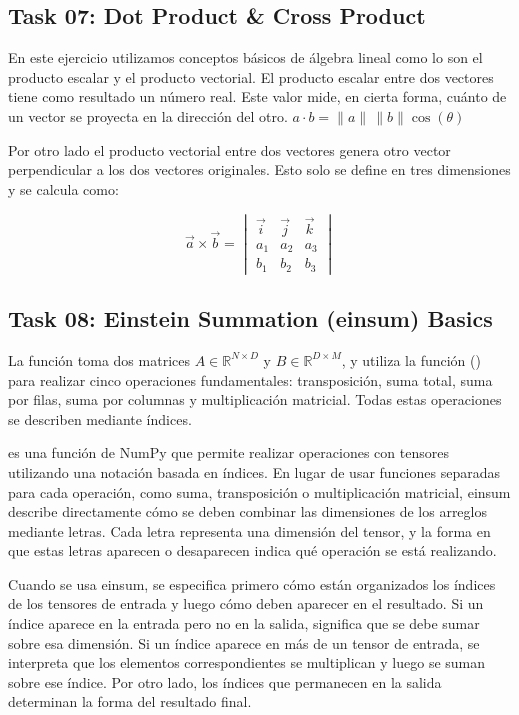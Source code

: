 ﻿\documentclass[12pt]{article}
\begin{document}
\subsection*{Task 07: Dot Product \& Cross Product}
En este ejercicio utilizamos conceptos básicos de álgebra lineal como lo son el producto escalar y el producto vectorial.
El producto escalar entre dos vectores tiene como resultado un número real. Este valor mide, en cierta forma, cuánto de un vector se proyecta en la dirección del otro. 
$a \cdot b = \|a\| \, \|b\| \cos(\theta)$

Por otro lado el producto vectorial entre dos vectores genera otro vector perpendicular a los dos vectores originales. Esto solo se define en tres dimensiones y se calcula como:

\[
\vec{a} \times \vec{b} =
\begin{vmatrix}
\vec{i} & \vec{j} & \vec{k} \\
a_1 & a_2 & a_3 \\
b_1 & b_2 & b_3
\end{vmatrix}
\]

\subsection*{Task 08: Einstein Summation (einsum) Basics}
La función  toma dos matrices $A \in \mathbb{R}^{N \times D}$ y $B \in \mathbb{R}^{D \times M}$, y utiliza la función () para realizar cinco operaciones fundamentales: transposición, suma total, suma por filas, suma por columnas y multiplicación matricial. Todas estas operaciones se describen mediante índices.

 es una función de NumPy que permite realizar operaciones con tensores utilizando una notación basada en índices. En lugar de usar funciones separadas para cada operación, como suma, transposición o multiplicación matricial, einsum describe directamente cómo se deben combinar las dimensiones de los arreglos mediante letras. Cada letra representa una dimensión del tensor, y la forma en que estas letras aparecen o desaparecen indica qué operación se está realizando.

Cuando se usa einsum, se especifica primero cómo están organizados los índices de los tensores de entrada y luego cómo deben aparecer en el resultado. Si un índice aparece en la entrada pero no en la salida, significa que se debe sumar sobre esa dimensión. Si un índice aparece en más de un tensor de entrada, se interpreta que los elementos correspondientes se multiplican y luego se suman sobre ese índice. Por otro lado, los índices que permanecen en la salida determinan la forma del resultado final.
\end{document}
